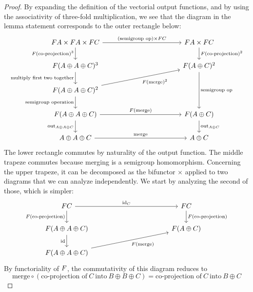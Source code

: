 \begin{proof}
    By expanding the definition of the vectorial output functions, and by using the associativity of three-fold multiplication, we see that the diagram in the lemma statement corresponds to the outer rectangle below:
    \[\begin{tikzcd}
        [column sep=4cm]
        \functor A\times \functor A \times \functor C
        \ar[d,"\functor(\text{co-projection})^3"']
        \ar[r,"(\text{semigroup op}) \times \functor C"]
        &
        \functor A \times \functor C
        \ar[d,"\functor(\text{co-projection})^2"]
        \\
        \functor(A \oplus A \oplus C)^3
        \ar[d,"\text{multiply first two together}"']
        &
        \functor(A \oplus C)^2
        \ar[dd,"\text{semigroup op}"]
        \\
        \functor(A \oplus A \oplus C)^2
        \ar[d,"\text{semigroup operation}"']
        \ar[ru,"F(\text{merge})^2"']
        \\
        \functor(A \oplus A \oplus C)
        \ar[d, "\outfun_{A \oplus A \oplus C}"']
        \ar[r,"F(\text{merge})"]
        &
        \functor(A \oplus C)
        \ar[d, "\outfun_{A\oplus C}"]
        \\ 
        A \oplus A \oplus C
        \ar[r,"\text{merge}"]
        &
        A \oplus C
    \end{tikzcd}\]
    The lower rectangle commutes by naturality of the output function. The middle trapeze commutes because merging is a semigroup homomorphism. Concerning the upper trapeze, it can be decomposed as the bifunctor $\times$ applied to two diagrams that we can analyze independently. We start by analyzing the second of those, which is simpler:
    \[\begin{tikzcd}
        [column sep=4cm]
        \functor C
        \ar[d,"\functor(\text{co-projection})"']
        \ar[r,"\mathrm{id}_C"]
        &
        \functor C
        \ar[d,"\functor(\text{co-projection})"]
        \\
        \functor(A \oplus A \oplus C)
        \ar[d,"\mathrm{id}"']
        &
        \functor(A \oplus C)
        \\
        \functor(A \oplus A \oplus C)
            \ar[ru,"F(\text{merge})"']
    \end{tikzcd}\]
    By functoriality of $\functor$, the commutativity of this diagram reduces to
    \[ \text{merge} \circ (\text{co-projection of}\ C\ \text{into}\ B\oplus B\oplus C) = \text{co-projection of}\ C\ \text{into}\ B\oplus C \]

\end{proof}
